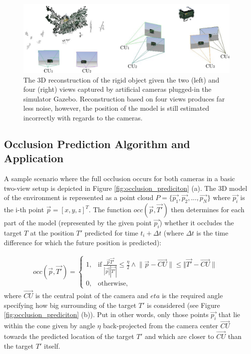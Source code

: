 \begin{figure}[htb]
	\centering
	\includegraphics[width=0.8\linewidth]{fig/3d_reconstruction_2vs4cus.pdf}
	\caption{The 3D reconstruction of the rigid object given the two (left) and four (right) views captured by artificial cameras plugged-in the simulator Gazebo. Reconstruction based on four views produces far less noise, however, the position of the model is still estimated incorrectly with regards to the cameras.}
	\label{fig:3d_reconstrcion_2vs4cus}
\end{figure}


\subsection{Occlusion Prediction Algorithm and Application} \label{txt:occlusion_prediction_algorithm}

A sample scenario where the full occlusion occurs for both cameras in a basic two-view setup is depicted in Figure \ref{fig:occlusion_prediciton} (a). The 3D model of the environment is represented as a point cloud $P = \{\vec{p_{1}}, \vec{p_{2}}, ..., \vec{p_{N}}\}$ where $\vec{p_{i}}$ is the i-th point $\vec{p} = [x, y, z]^{T}$. The function $occ(\vec{p}, \vec{T'})$ then determines for each part of the model (represented by the given point $\vec{p_{i}}$) whether it occludes the target $T$ at the position $T'$ predicted for time $t_{i}+\Delta t$ (where $\Delta t$ is the time difference for which the future position is predicted):

\begin{align}
occ(\vec{p}, \vec{T'}) = 
	\begin{cases}
		1, & \text{if}\ \frac{\vec{p}\vec{T'}}{|\vec{p}||\vec{T'}|} \leq \frac{\eta}{2} \land \lVert \vec{p} - \vec{CU} \rVert \leq \Vert \vec{T'} - \vec{CU} \rVert \\		
		0, & \text{otherwise},
	\end{cases}
\end{align}
where $\vec{CU}$ is the central point of the camera and $eta$ is the required angle specifying how big surrounding of the target $T'$ is considered (see Figure \ref{fig:occlusion_prediciton} (b)). Put in other words, only those points $\vec{p_{i}}$ that lie within the cone given by angle $\eta$ back-projected from the camera center $\vec{CU}$ towards the predicted location of the target $T'$ and which are closer to $\vec{CU}$ than the target $T'$ itself.

